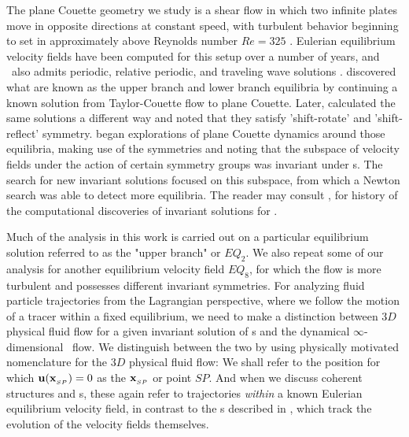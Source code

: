 The plane Couette geometry we study is a shear flow in which two infinite 
plates move in opposite directions at constant speed, with turbulent 
behavior beginning to set in approximately above Reynolds number $Re=325$ 
\citep{GHCV08}. Eulerian equilibrium velocity fields have been computed 
for this setup over a number of years, and \pCf\ also admits periodic, 
relative periodic, and traveling wave solutions \citep{GHCV08,DV04}. 
\citet{N90} discovered what are known as the upper branch and 
lower branch equilibria by continuing a known solution from 
Taylor-Couette flow to plane Couette. Later, %
\citet{W03} 
calculated the same solutions a different way and noted that they satisfy 
'shift-rotate' and 'shift-reflect' symmetry. 
\citet{GHCW07} 
began explorations of plane Couette dynamics around those equilibria, 
making use of the symmetries and noting that the subspace of velocity 
fields under the action of certain symmetry groups was invariant under 
{\NSe}s. The search for new invariant solutions focused on this 
subspace, from which a Newton search was able to detect more equilibria. 
The reader may consult \citet{GHCV08}, \citet{GHCW07} for 
history of the computational discoveries of invariant solutions for 
{\pCf}. 

Much of the analysis in this work is carried out on a particular 
equilibrium solution referred to as the "upper branch" or $EQ_2$. We also 
repeat some of our analysis  for another equilibrium velocity field 
$EQ_8$, for which the flow is more turbulent and possesses different 
invariant symmetries. For analyzing fluid particle trajectories from the 
Lagrangian perspective, where we follow the motion of a tracer within a 
fixed equilibrium,  we need to make a distinction between $3D$ physical 
fluid flow for a given invariant solution of {\NSe}s and the dynamical 
$\infty$-dimensional \statesp\ flow. We distinguish between the two by 
using physically motivated nomenclature for the $3D$ physical fluid flow: 
We shall refer to the position for which ${\bf u}({\bf x}_{_{SP}})=0$ as the {\em 
\stagp} ${\bf x}_{_{SP}}$ or point $SP$. And when we discuss coherent 
structures and {\hc}s, these again refer to trajectories \emph{within} 
a known Eulerian equilibrium velocity field, in contrast to the {\hc}s 
described in \citet{GHCV08}, which track the evolution of the 
velocity fields themselves. 

